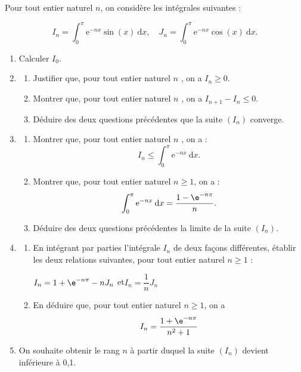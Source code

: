 \medskip

Pour tout entier naturel $n$, on considère les intégrales suivantes :

\[I_n = \displaystyle\int_0^{\pi} \text{e}^{- nx}\sin (x)\:\text{d}x, \quad  J_n = \displaystyle\int_0^{\pi} \text{e}^{-nx}\cos (x)\:\text{d}x.\]

\medskip

\begin{enumerate}
\item Calculer $I_0$.
\item 
	\begin{enumerate}
		\item Justifier que, pour tout entier naturel $n$ , on a $I_n \geqslant 0$.
		\item Montrer que, pour tout entier naturel $n$ , on a $I_{n+1} - I_n \leqslant 0$.
		\item Déduire des deux questions précédentes que la suite $\left(I_n\right)$ converge.
	\end{enumerate}
\item
	\begin{enumerate}
		\item Montrer que, pour tout entier naturel $n$ , on a : 
		\[I_n \leqslant \displaystyle\int_0^{\pi} \text{e}^{- nx}\:\text{d}x.\]
		

		\item Montrer que, pour tout entier naturel $n \geqslant 1$, on a : 
		\[\displaystyle\int_0^{\pi} \text{e}^{- nx}\:\text{d}x = \dfrac{1 - \e^{-n \pi}}{n}.\]
		
		\item Déduire des deux questions précédentes la limite de la suite $\left(I_n\right)$.
	\end{enumerate}
\item
	\begin{enumerate}
		\item En intégrant par parties l'intégrale $I_n$ de deux façons différentes, établir les deux relations suivantes, pour tout entier naturel $n \geqslant 1$ :

\begin{center}$I_n = 1 + \e^{-n\pi} - nJ_n$ \quad et\quad  $I_n = \dfrac 1n J_n$\end{center}

		\item En déduire que, pour tout entier naturel $n \geqslant 1$, on a 
		\[I_n = \dfrac{1 + \e^{-n \pi}}{n^2 + 1}\]
	\end{enumerate}
\item On souhaite obtenir le rang $n$ à partir duquel la suite $\left(I_n\right)$ devient inférieure à 0,1.


\end{enumerate}
